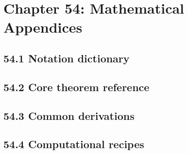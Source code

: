 \section{Chapter 54: Mathematical Appendices}

\subsection{54.1 Notation dictionary}

\subsection{54.2 Core theorem reference}

\subsection{54.3 Common derivations}

\subsection{54.4 Computational recipes}

\clearpage
